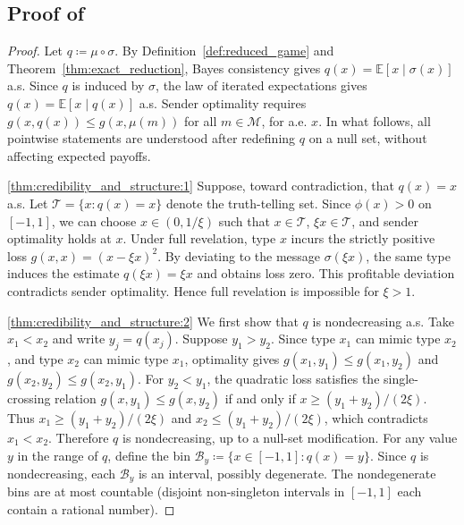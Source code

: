 \documentclass[journal,twoside,web]{ieeecolor}
\begin{document}
\subsection{Proof of }
\label{app:proof_thm3}
\begin{proof}
    Let $q\coloneqq\mu\circ\sigma$. By Definition~\ref{def:reduced_game} and
    Theorem~\ref{thm:exact_reduction}, Bayes consistency gives
    $q(x)=\mathbb E[x\mid\sigma(x)]$ a.s. Since $q$ is induced by $\sigma$, the
    law of iterated expectations gives $q(x)=\mathbb E[x\mid q(x)]$ a.s. Sender
    optimality requires $g(x,q(x))\le g(x,\mu(m))$ for all $m\in\mathcal M$, for
    a.e. $x$. In what follows, all pointwise statements are understood after
    redefining $q$ on a null set, without affecting expected payoffs.

    \ref{thm:credibility_and_structure:1}
    Suppose, toward contradiction, that $q(x)=x$ a.s. Let
    $\mathcal T=\{x:q(x)=x\}$ denote the truth-telling set. Since $\phi(x)>0$ on
    $[-1,1]$, we can choose $x\in(0,1/\xi)$ such that $x\in\mathcal T$, $\xi x\in
        \mathcal T$, and sender optimality holds at $x$. Under full revelation, type
    $x$ incurs the strictly positive loss $g(x,x)=(x-\xi x)^2$. By deviating to
    the message $\sigma(\xi x)$, the same type induces the estimate
    $q(\xi x)=\xi x$ and obtains loss zero. This profitable deviation contradicts
    sender optimality. Hence full revelation is impossible for $\xi>1$.

    \ref{thm:credibility_and_structure:2}
    We first show that $q$ is nondecreasing a.s. Take $x_1<x_2$ and write
    $y_j=q(x_j)$. Suppose $y_1>y_2$. Since type $x_1$ can mimic type $x_2$, and
    type $x_2$ can mimic type $x_1$, optimality gives
    $g(x_1,y_1)\le g(x_1,y_2)$ and $g(x_2,y_2)\le g(x_2,y_1)$. For $y_2<y_1$, the
    quadratic loss satisfies the single-crossing relation
    $g(x,y_1)\le g(x,y_2)$ if and only if $x\ge (y_1+y_2)/(2\xi)$. Thus
    $x_1\ge (y_1+y_2)/(2\xi)$ and $x_2\le (y_1+y_2)/(2\xi)$, which contradicts
    $x_1<x_2$. Therefore $q$ is nondecreasing, up to a null-set modification. For any value $y$ in the range of $q$, define the bin
    $\mathcal B_y\coloneqq\{x\in[-1,1]:q(x)=y\}$. Since $q$ is nondecreasing, each
    $\mathcal B_y$ is an interval, possibly degenerate. The nondegenerate bins are
    at most countable (disjoint non-singleton intervals in $[-1,1]$ each
    contain a rational number).


\end{proof}
\end{document}
